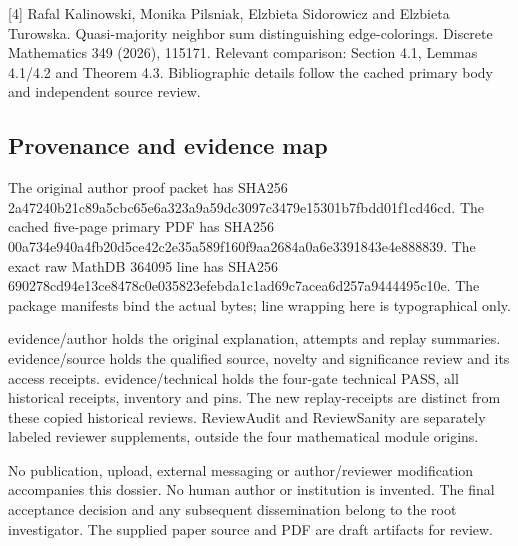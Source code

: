 \documentclass[10pt]{article}
\begin{document}
[4] Rafal Kalinowski, Monika Pilsniak, Elzbieta Sidorowicz and Elzbieta Turowska. Quasi-majority neighbor sum distinguishing edge-colorings. Discrete Mathematics 349 (2026), 115171. Relevant comparison: Section 4.1, Lemmas 4.1/4.2 and Theorem 4.3. Bibliographic details follow the cached primary body and independent source review.


\subsection*{Provenance and evidence map}
The original author proof packet has SHA256 2a47240b21c89a5cbc65e6a323a9a59dc3097c3479e15301b7fbdd01f1cd46cd. The cached five-page primary PDF has SHA256 00a734e940a4fb20d5ce42c2e35a589f160f9aa2684a0a6e3391843e4e888839. The exact raw MathDB 364095 line has SHA256 690278cd94e13ce8478c0e035823efebda1c1ad69c7acea6d257a9444495c10e. The package manifests bind the actual bytes; line wrapping here is typographical only.


evidence/author holds the original explanation, attempts and replay summaries. evidence/source holds the qualified source, novelty and significance review and its access receipts. evidence/technical holds the four-gate technical PASS, all historical receipts, inventory and pins. The new replay-receipts are distinct from these copied historical reviews. ReviewAudit and ReviewSanity are separately labeled reviewer supplements, outside the four mathematical module origins.


No publication, upload, external messaging or author/reviewer modification accompanies this dossier. No human author or institution is invented. The final acceptance decision and any subsequent dissemination belong to the root investigator. The supplied paper source and PDF are draft artifacts for review.
\end{document}
